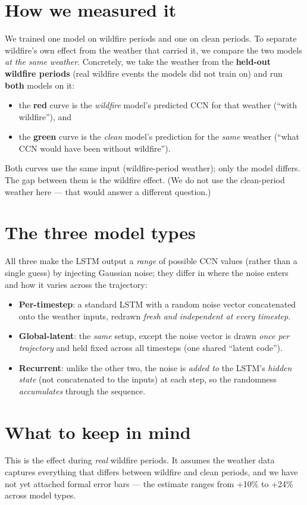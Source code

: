 \documentclass[11pt]{article}
\begin{document}
\section*{How we measured it}
We trained one model on wildfire periods and one on clean periods. To separate
wildfire's own effect from the weather that carried it, we compare the two models
\emph{at the same weather}. Concretely, we take the weather from the \textbf{held-out
wildfire periods} (real wildfire events the models did not train on) and run
\textbf{both} models on it:
\begin{itemize}
\item the \textbf{red} curve is the \emph{wildfire} model's predicted CCN for that
weather (``with wildfire''), and
\item the \textbf{green} curve is the \emph{clean} model's prediction for the
\emph{same} weather (``what CCN would have been without wildfire'').
\end{itemize}
Both curves use the same input (wildfire-period weather); only the model differs. The
gap between them is the wildfire effect. (We do not use the clean-period weather here
--- that would answer a different question.)

\section*{The three model types}
All three make the LSTM output a \emph{range} of possible CCN values (rather than a
single guess) by injecting Gaussian noise; they differ in where the noise enters and
how it varies across the trajectory:
\begin{itemize}
\item \textbf{Per-timestep}: a standard LSTM with a random noise vector concatenated
onto the weather inputs, redrawn \emph{fresh and independent at every timestep}.
\item \textbf{Global-latent}: the \emph{same} setup, except the noise vector is drawn
\emph{once per trajectory} and held fixed across all timesteps (one shared ``latent
code'').
\item \textbf{Recurrent}: unlike the other two, the noise is \emph{added to} the
LSTM's \emph{hidden state} (not concatenated to the inputs) at each step, so the
randomness \emph{accumulates} through the sequence.
\end{itemize}

\section*{What to keep in mind}
This is the effect during \emph{real} wildfire periods. It assumes the weather data
captures everything that differs between wildfire and clean periods, and we have not
yet attached formal error bars --- the estimate ranges from +10\% to +24\% across
model types.
\end{document}
